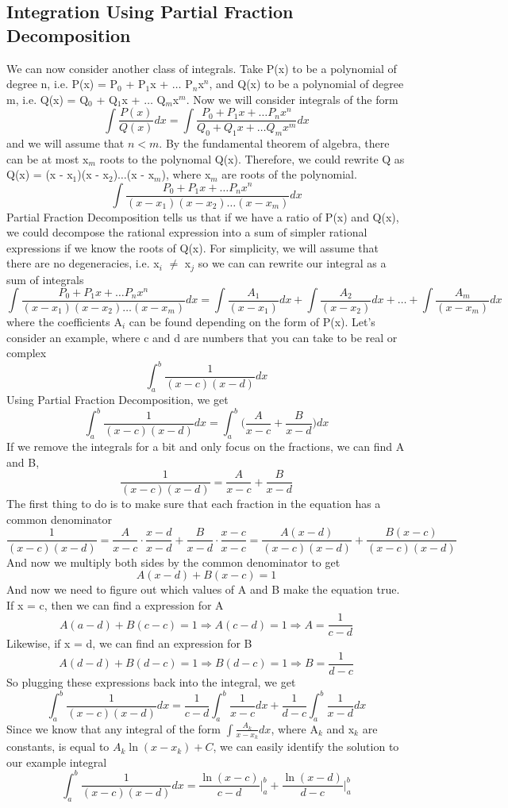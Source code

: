 \documentclass{article}
\newcommand{\be}{\begin{equation}}
\newcommand{\ee}{\end{equation}}
\begin{document}
\subsection*{Integration Using Partial Fraction Decomposition}
We can now consider another class of integrals.
Take P(x) to be a polynomial of degree n, i.e. P(x) = P$_0$ + P$_1$x + $\hdots$ P$_n$x$^n$, and Q(x) to be a polynomial of degree m, i.e. Q(x) = Q$_0$ + Q$_1$x + $\hdots$ Q$_m$x$^m$.
Now we will consider integrals of the form
\be
\int \frac{P(x)}{Q(x)} dx = \int \frac{P_0 + P_1x + \hdots P_nx^n}{Q_0 + Q_1x + \hdots Q_mx^m} dx
\ee
and we will assume that $n<m$.
By the fundamental theorem of algebra, there can be at most x$_m$ roots to the polynomal Q(x).
Therefore, we could rewrite Q as Q(x) = (x - x$_1$)(x - x$_2$)$\hdots$(x - x$_m$), where x$_m$ are roots of the polynomial.
\be
\int \frac{P_0 + P_1x + \hdots P_nx^n}{(x - x_1)(x - x_2)\hdots(x - x_m)} dx
\ee
Partial Fraction Decomposition tells us that if we have a ratio of P(x) and Q(x), we could decompose the rational expression into a sum of simpler rational expressions if we know the roots of Q(x).
For simplicity, we will assume that there are no degeneracies, i.e. x$_i$ $\neq$ x$_j$ so we can can rewrite our integral as a sum of integrals
\be
\int \frac{P_0 + P_1x + \hdots P_nx^n}{(x - x_1)(x - x_2)\hdots(x - x_m)} dx = \int \frac{A_1}{(x - x_1)} dx + \int \frac{A_2}{(x - x_2)} dx + \hdots + \int \frac{A_m}{(x - x_m)} dx
\ee
where the coefficients A$_i$ can be found depending on the form of P(x).
Let's consider an example, where c and d are numbers that you can take to be real or complex
\be
\int_a^b \frac{1}{(x-c)(x-d)} dx
\ee
Using Partial Fraction Decomposition, we get
\be
\int_a^b \frac{1}{(x-c)(x-d)} dx = \int_a^b \Big( \frac{A}{x-c} + \frac{B}{x-d} \Big) dx
\ee
If we remove the integrals for a bit and only focus on the fractions, we can find A and B,
\be
\frac{1}{(x-c)(x-d)} = \frac{A}{x-c} + \frac{B}{x-d}
\ee
The first thing to do is to make sure that each fraction in the equation has a common denominator
\be
\frac{1}{(x-c)(x-d)} = \frac{A}{x-c} \cdot \frac{x-d}{x-d} + \frac{B}{x-d} \cdot \frac{x-c}{x-c} = \frac{A(x-d)}{(x-c)(x-d)} + \frac{B(x-c)}{(x-c)(x-d)}
\ee
And now we multiply both sides by the common denominator to get
\be
A(x-d) + B(x-c) = 1
\ee
And now we need to figure out which values of A and B make the equation true.
If x = c, then we can find a expression for A
\be
A(a-d) + B(c-c) = 1 \Rightarrow A(c-d) = 1 \Rightarrow A = \frac{1}{c-d}
\ee
Likewise, if x = d, we can find an expression for B
\be
A(d-d) + B(d-c) = 1 \Rightarrow B(d-c) = 1 \Rightarrow B = \frac{1}{d-c}
\ee
So plugging these expressions back into the integral, we get
\be
\int_a^b \frac{1}{(x-c)(x-d)} dx = \frac{1}{c-d} \int_a^b \frac{1}{x-c} dx + \frac{1}{d-c} \int_a^b \frac{1}{x-d} dx
\ee
Since we know that any integral of the form $\int \frac{A_k}{x-x_k} dx$, where A$_k$ and x$_k$ are constants, is equal to $A_k \ln(x-x_k) + C$, we can easily identify the solution to our example integral
\be
\int_a^b \frac{1}{(x-c)(x-d)} dx = \frac{\ln(x-c)}{c-d} \Big|_a^b + \frac{\ln(x-d)}{d-c} \Big|_a^b
\ee
\end{document}
